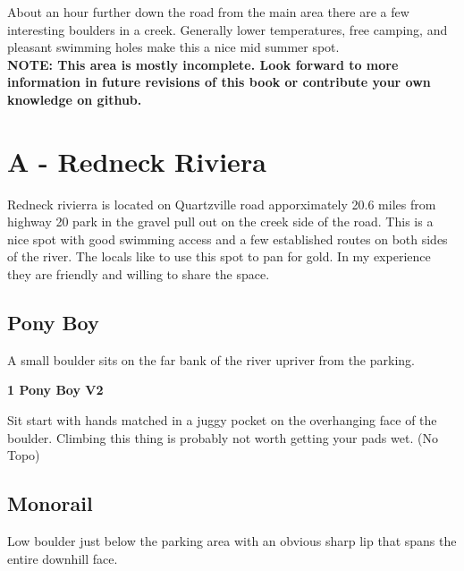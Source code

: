 \raggedcolumns
\begin{multicols}{2}
About an hour further down the road from the main area there are a few interesting boulders in a creek. Generally lower temperatures, free camping, and pleasant swimming holes make this a nice mid summer spot.\\

\textbf{NOTE: This area is mostly incomplete. Look forward to more information in future revisions of this book or contribute your own knowledge on github.}\\

\newpage

		\section{A - Redneck Riviera}\label{sa:Redneck Riviera}
	Redneck rivierra is located on Quartzville road apporximately 20.6 miles from highway 20 park in the gravel pull out on the creek side of the road. This is a nice spot with good swimming access and a few established routes on both sides of the river. The locals like to use this spot to pan for gold. In my experience they are friendly and willing to share the space.\\

	
			\subsection*{Pony Boy}\label{bf:Pony Boy}
			A small boulder sits on the far bank of the river upriver from the parking.\\
			
					\label{rt:Pony Boy}
\colorbox{green!20}{
\parbox{0.95\linewidth}{
\textbf{
1 Pony Boy V2  
}
}
}

					\begin{adjustwidth}{0.5cm}{}				
					Sit start with hands matched in a juggy pocket on the overhanging face of the boulder. Climbing this thing is probably not worth getting your pads wet.
						\newline (No Topo) 
					\end{adjustwidth}
			\subsection*{Monorail}\label{bf:Monorail}
			Low boulder just below the parking area with an obvious sharp lip that spans the entire downhill face.\\
			

\end{multicols}
